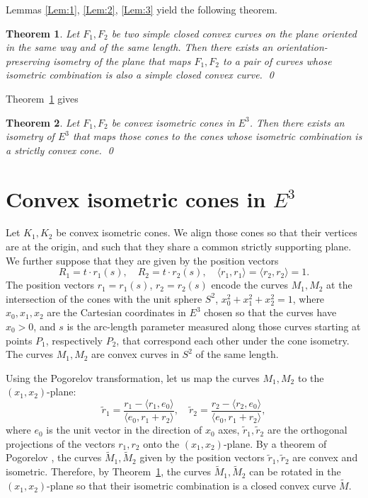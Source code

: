 \documentclass[11pt,oneside]{amsart}
\theoremstyle{theorem}
\newtheorem{theorem}{Theorem}
\theoremstyle{definition}
\theoremstyle{remark}
\begin{document}
Lemmas \ref{Lem:1}, \ref{Lem:2}, \ref{Lem:3} yield the following theorem.

\begin{theorem}
\label{Thm:3}
Let $F_1, F_2$ be two simple closed convex curves on the plane oriented in the same way and of the same length. Then there exists an orientation-preserving isometry of the plane that maps $F_1, F_2$ to a pair of curves whose isometric combination is also a simple closed convex curve. \qed
\end{theorem}

Theorem~\ref{Thm:3} gives

\begin{theorem}
\label{Thm:4}
Let $F_1, F_2$ be convex isometric cones in $E^3$. Then there exists an isometry of $E^3$ that maps those cones to the cones whose isometric combination is a strictly convex cone. \qed
\end{theorem}


\section{Convex isometric cones in $E^3$}

Let $K_1, K_2$ be convex isometric cones. We align those cones so that their vertices are at the origin, and such that they share a common strictly supporting plane. We further suppose that they are given by the position vectors
\[
R_1 = t \cdot r_1(s), \quad R_2 = t \cdot r_2(s), \quad \langle r_1, r_1 \rangle  = \langle r_2, r_2 \rangle = 1.
\]
The position vectors $r_1 = r_1(s)$, $r_2 = r_2(s)$ encode the curves $M_1, M_2$ at the intersection of the cones with the unit sphere $S^2$, $x_0^2+x_1^2+x_2^2=1$, where $x_0, x_1, x_2$ are the Cartesian coordinates in $E^3$ chosen so that the curves have $x_0 > 0$, and $s$ is the arc-length parameter measured along those curves starting at points $P_1$, respectively $P_2$, that correspond each other under the cone isometry. The curves $M_1, M_2$ are convex curves in $S^2$ of the same length.

Using the Pogorelov transformation, let us map the curves $M_1, M_2$ to the $(x_1, x_2)$-plane:
\[
\tilde r_1 = \frac{r_1 - \langle r_1, e_0 \rangle}{\langle e_0, r_1 + r_2 \rangle}, \quad \tilde r_2 = \frac{r_2 - \langle r_2, e_0 \rangle}{\langle e_0, r_1 + r_2 \rangle},
\]
where $e_0$ is the unit vector in the direction of $x_0$ axes, $\tilde r_1, \tilde r_2$ are the orthogonal projections of the vectors $r_1, r_2$ onto the $(x_1, x_2)$-plane. By a theorem of Pogorelov \cite[Ch.5, \S 3]{Pog}, the curves $\tilde M_1, \tilde M_2$ given by the position vectors $\tilde r_1, \tilde r_2$ are convex and isometric. Therefore, by Theorem~\ref{Thm:3}, the curves $\tilde M_1, \tilde M_2$ can be rotated in the $(x_1, x_2)$-plane so that their isometric combination is a closed convex curve $\tilde M$.
\end{document}
